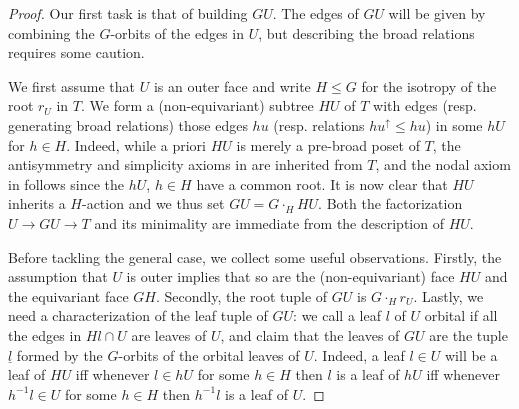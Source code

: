 \documentclass[a4paper,10p,draft]{article}%
\numberwithin{equation}{section}%
\begin{document}
\begin{proof}
	Our first task is that of building $GU$. The edges of $GU$ will be given by combining 
	the $G$-orbits of the edges in $U$, but describing the broad relations requires some caution.

	We first assume that $U$ is an outer face and write	$H \leq G$ for the isotropy of the root $r_U$ in $T$.
	We form a (non-equivariant) subtree $HU$ of $T$ with edges (resp. generating broad relations) those edges
	$h u$ (resp. relations $h u^{\uparrow} \leq hu$) in some $hU$ for $h \in H$.
	Indeed, while a priori $HU$ is merely a pre-broad poset of $T$, the antisymmetry and simplicity axioms in \cite[Defs. 5.1 and 5.3]{Per17} are inherited from $T$, and the nodal axiom in
	\cite[Def. 5.9]{Per17} follows since the $h U$, $h \in H$ have a common root. It is now clear that $HU$ inherits a $H$-action and we thus set $GU = G \cdot_H HU$.
	Both the factorization $U \to GU \to T$ and its minimality are immediate from the description of $HU$.
	
	Before tackling the general case, we collect some useful observations. Firstly, the assumption that $U$ is outer implies that so are the (non-equivariant) face $HU$ and the equivariant face $GH$. Secondly, the root tuple of 
	$GU$ is $G\cdot_H r_U$.
	Lastly, we need a characterization of the leaf tuple of $GU$: we call a leaf $l$ of $U$ orbital if 
all the edges in $Hl \cap U$ are leaves of $U$, 
	and claim that the leaves of $GU$ are the tuple $\underline{l}$ formed by the $G$-orbits of the orbital leaves of $U$. Indeed, a leaf $l\in U$ will be a leaf of $HU$ iff whenever $l \in hU$ for some $h\in H$ then $l$ is a leaf of $hU$ iff
	whenever $h^{-1} l \in U$ for some $h\in H$ then $h^{-1}l$ is a leaf of $U$.
	

\end{proof}
\end{document}
